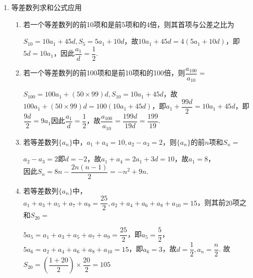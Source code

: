 \begin{enumerate}
\begin{enumerate}
\begin{jieda}
        \end{jieda}
        \item 若等差数列$\{a_n\}$的前10项和为100，前20项和为400，则前30项和
        \begin{jieda}
            $S_{10} = 100, S_{20} - S_{10} = 300 \Rightarrow S_{30} - S_{20} = 500$，故$S_{30} = 900$.
        \end{jieda}
        \item 设等差数列 $\left\{  {a}_{n}\right\}$ 的前 $n$ 项和为 ${S}_{n}$ ,若 ${S}_{3} = 9,{S}_{6} = {36}$ ,则 ${a}_{7} + {a}_{8} + {a}_{9} =$ .
    \end{enumerate}
    \item 等差数列求和公式应用
    \begin{enumerate}
        \item 若一个等差数列的前10项和是前5项和的4倍，则其首项与公差之比为
        \begin{jieda}
            $S_{10} = 10a_1 + 45d, S_5 = 5a_1 + 10d$，故$10a_1 + 45d = 4(5a_1 + 10d)$，即$5d = 10a_1$，因此$\dfrac{a_1}{d} = \dfrac{1}{2}$.
        \end{jieda}
        \item 若一个等差数列的前100项和是前10项和的100倍，则$\dfrac{a_{100}}{a_{10}} = $
        \begin{jieda}
            $S_{100} = 100a_1 + (50\times 99) d, S_{10} = 10a_1 + 45d$，故$100a_1 + (50\times 99) d = 100(10a_1 + 45d)$，即$a_1 + \dfrac{99d}{2} = 10a_1 + 45d$，即$\dfrac{9d}{2} = 9a_1$因此$\dfrac{a_1}{d} = \dfrac{1}{2}$，故$\dfrac{a_{100}}{a_{10}} = \dfrac{199d}{19d} = \dfrac{199}{19}$.
        \end{jieda}
        \item 若等差数列$\{a_n\}$中，$a_1 + a_4 = 10, a_2 - a_3 = 2$，则$\{a_n\}$的前$n$项和$S_n = $
        \begin{jieda}
            $a_2 - a_3 = 2$即$d = -2$，故$a_1 + a_4 = 2a_1 + 3d = 10$，故$a_1 = 8$，\\
            因此$S_n = 8n - \dfrac{2n (n-1)}{2} = -n^2 + 9n$.
        \end{jieda}
        \item 若等差数列$\{a_n\}$中，$a_1 + a_3 + a_5 + a_7 + a_9 = \dfrac{25}{2}, a_2 + a_4 + a_6 + a_8 + a_{10} = 15$，则其前$20$项之和$S_{20} = $
        \begin{jieda}
            $5a_5 = a_1 + a_3 + a_5 + a_7 + a_9 = \dfrac{25}{2}$，即$a_5 = \dfrac{5}{2}$，$5a_6 = a_2 + a_4 + a_6 + a_8 + a_{10} = 15$，即$a_6 = 3$，故$d = \dfrac{1}{2}, a_n = \dfrac{n}{2}$. 故$S_{20} = (\dfrac{1+20}{2}) \times \dfrac{20}{2} = 105$

\end{jieda}
\end{enumerate}
\end{enumerate}
